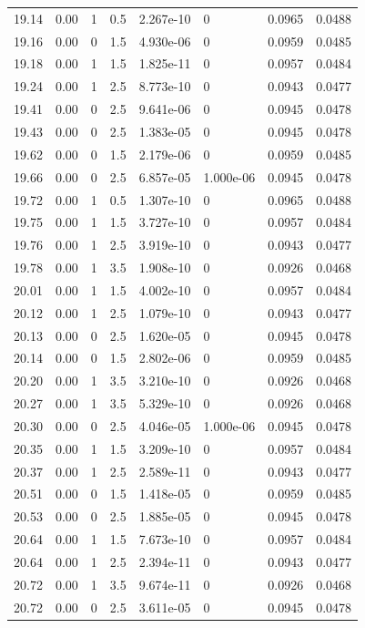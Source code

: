 \documentclass[preview]{standalone}
\begin{document}
{{{{{{{{{\begin{tabular}{L{1.2cm}C{1.2cm} C{0.3cm}C{0.5cm} C{1.4cm}C{1.4cm} C{1.4cm}C{1.4cm}}
  19.14  &  0.00  & 1     & 0.5 &  2.267e-10  & 0  & 0.0965 &  0.0488   \\ 
  19.16  &  0.00  & 0     & 1.5 &  4.930e-06  & 0  & 0.0959 &  0.0485   \\ 
  19.18  &  0.00  & 1     & 1.5 &  1.825e-11  & 0  & 0.0957 &  0.0484   \\ 
  19.24  &  0.00  & 1     & 2.5 &  8.773e-10  & 0  & 0.0943 &  0.0477   \\ 
  19.41  &  0.00  & 0     & 2.5 &  9.641e-06  & 0  & 0.0945 &  0.0478   \\ 
  19.43  &  0.00  & 0     & 2.5 &  1.383e-05  & 0  & 0.0945 &  0.0478   \\ 
  19.62  &  0.00  & 0     & 1.5 &  2.179e-06  & 0  & 0.0959 &  0.0485   \\ 
  19.66  &  0.00  & 0     & 2.5 &  6.857e-05  & 1.000e-06  & 0.0945 &  0.0478   \\ 
  19.72  &  0.00  & 1     & 0.5 &  1.307e-10  & 0  & 0.0965 &  0.0488   \\ 
  19.75  &  0.00  & 1     & 1.5 &  3.727e-10  & 0  & 0.0957 &  0.0484   \\ 
  19.76  &  0.00  & 1     & 2.5 &  3.919e-10  & 0  & 0.0943 &  0.0477   \\ 
  19.78  &  0.00  & 1     & 3.5 &  1.908e-10  & 0  & 0.0926 &  0.0468   \\ 
  20.01  &  0.00  & 1     & 1.5 &  4.002e-10  & 0  & 0.0957 &  0.0484   \\ 
  20.12  &  0.00  & 1     & 2.5 &  1.079e-10  & 0  & 0.0943 &  0.0477   \\ 
  20.13  &  0.00  & 0     & 2.5 &  1.620e-05  & 0  & 0.0945 &  0.0478   \\ 
  20.14  &  0.00  & 0     & 1.5 &  2.802e-06  & 0  & 0.0959 &  0.0485   \\ 
  20.20  &  0.00  & 1     & 3.5 &  3.210e-10  & 0  & 0.0926 &  0.0468   \\ 
  20.27  &  0.00  & 1     & 3.5 &  5.329e-10  & 0  & 0.0926 &  0.0468   \\ 
  20.30  &  0.00  & 0     & 2.5 &  4.046e-05  & 1.000e-06  & 0.0945 &  0.0478   \\ 
  20.35  &  0.00  & 1     & 1.5 &  3.209e-10  & 0  & 0.0957 &  0.0484   \\ 
  20.37  &  0.00  & 1     & 2.5 &  2.589e-11  & 0  & 0.0943 &  0.0477   \\ 
  20.51  &  0.00  & 0     & 1.5 &  1.418e-05  & 0  & 0.0959 &  0.0485   \\ 
  20.53  &  0.00  & 0     & 2.5 &  1.885e-05  & 0  & 0.0945 &  0.0478   \\ 
  20.64  &  0.00  & 1     & 1.5 &  7.673e-10  & 0  & 0.0957 &  0.0484   \\ 
  20.64  &  0.00  & 1     & 2.5 &  2.394e-11  & 0  & 0.0943 &  0.0477   \\ 
  20.72  &  0.00  & 1     & 3.5 &  9.674e-11  & 0  & 0.0926 &  0.0468   \\ 
  20.72  &  0.00  & 0     & 2.5 &  3.611e-05  & 0  & 0.0945 &  0.0478   \\ 
\hline 
\end{tabular} 

}}}}}}}}}
\end{document}
